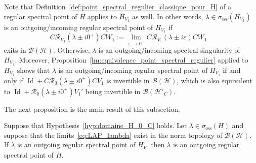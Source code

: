 \documentclass[AHL,Unicode,longabstracts,published]{cedram}
\newcommand{\Hi}{\mathcal{H}}
\newcommand{\ess}{\mathrm{ess}}
\newcommand{\Res}{\mathcal{R}}
\newcommand{\clB}{\mathcal{B}}
\DeclareMathOperator{\Id}{Id}
\newcommand{\Hi}{\mathcal{H}}
\newcommand{\ess}{\mathrm{ess}}
\begin{document}
Note that Definition~\ref{def:point_spectral_regulier_classique_pour_H} of a regular spectral point of $H$ applies to $H_{V_1}$ as well. In other words, $\lambda\in\sigma_{\ess}(H_{V_1})$ is an outgoing/incoming regular spectral point of $H_{V_1}$ if
\begin{equation*}
C\Res_{V_1}\left(\lambda\pm i0^+\right)CW_1:=\lim_{\varepsilon\,\rightarrow\,0^+}C\Res_{V_1}(\lambda\pm i\varepsilon)CW_1
\end{equation*}
exits in $\clB(\Hi)$. Otherwise, $\lambda$ is an outgoing/incoming spectral singularity of $H_{V_1}$. Moreover, Proposition~\ref{lm:equivalence_point_spectral_regulier} applied to $H_{V_1}$ shows that $\lambda$ is an outgoing/incoming regular spectral point of $H_{V_1}$ if and only if $\Id+C\Res_0(\lambda\pm i0^+)CV_1$ is invertible in $\clB(\Hi)$, which is also equivalent to $\Id+\Res_0(\lambda\pm i0^+)V_1'$ being invertible in $\clB(\Hi'_C)$.

The next proposition is the main result of this subsection.



\begin{prop}\label{prop:no_spectr_sing_diss}
Suppose that Hypothesis~\ref{hyp:domaine_H_0_C} holds. Let $\lambda\in\sigma_\ess(H)$ and suppose that the limits~\eqref{eq:LAP_lambda} exist in the norm topology of $\clB(\Hi)$. If $\lambda$ is an outgoing regular spectral point of $H_{V_1}$ then $\lambda$ is an outgoing regular spectral point of $H$.
\end{prop}
\end{document}
